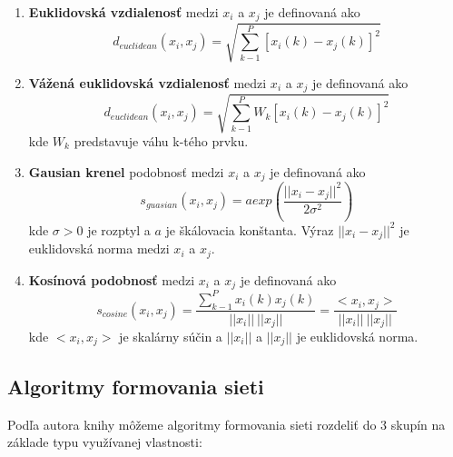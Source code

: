 \documentclass[slovak,master,dept460,male,cpp,cpdeclaration]{diploma}
\begin{document}
\begin{enumerate}
\item \textbf{Euklidovská vzdialenosť} medzi  $x_i$ a $x_j$ je definovaná ako 
\begin{equation}
d_{euclidean}(x_i,x_j)= \sqrt{\sum_{k-1}^P [x_i(k) - x_j(k)]^2}
\end{equation}
\item \textbf{Vážená euklidovská vzdialenosť} medzi  $x_i$ a $x_j$ je definovaná ako 
\begin{equation}
d_{euclidean}(x_i,x_j)= \sqrt{\sum_{k-1}^P W_k[x_i(k) - x_j(k)]^2}
\end{equation} kde $W_k$ predstavuje váhu k-tého prvku.
\item \textbf{Gausian krenel} podobnosť medzi  $x_i$ a $x_j$ je definovaná ako
\begin{equation}
s_{guasian}(x_i,x_j) = a exp(\frac{|| x_i - x_j||^2}{2\sigma^2} )
\end{equation}
kde $\sigma > 0$ je rozptyl a $a$ je škálovacia konštanta. Výraz $|| x_i - x_j||^2$  je euklidovská norma medzi $x_i$ a $x_j$.
\item \textbf{Kosínová podobnosť} medzi  $x_i$ a $x_j$ je definovaná ako
\begin{equation}
s_{cosine}(x_i,x_j) = \frac{\sum_{k-1}^Px_i(k)x_j(k)}{||x_i|| \ ||x_j||}  = \frac{<x_i, x_j>}{||x_i|| \ ||x_j||}
\end{equation}kde $<x_i,x_j>$ je skalárny súčin a $||x_i||$ a $||x_j||$ je euklidovská norma.
\end{enumerate}

\subsection{Algoritmy formovania sieti} \label{network_construction}
Podľa autora knihy \cite{godbook}  môžeme algoritmy formovania sieti rozdeliť do 3 skupín na základe typu využívanej vlastnosti:
\end{document}
